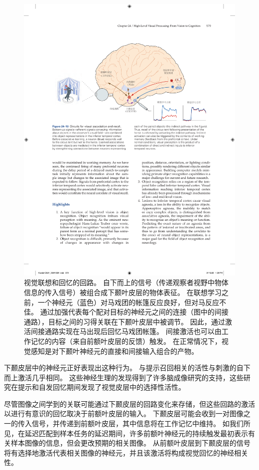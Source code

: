 \begin{figure}[htbp]
	\centering
	\includegraphics[width=1.0\linewidth]{chap24/fig_24_13}
	\caption{视觉联想和回忆的回路。
		自下而上的信号（传递观察者视野中物体信息的传入信号）被组合成下颞叶皮层的物体表征。
		在联想学习之前，一个神经元（蓝色）对马戏团的帐篷反应良好，但对马反应不佳。
		通过加强代表每个配对目标的神经元之间的连接（图中的间接通路），目标之间的习得关联在下颞叶皮层中被调节。
		因此，通过激活间接通路实现在马出现后回忆马戏团帐篷。
		间接激活也可以由工作记忆的内容（来自前额叶皮层的反馈）触发。
		在正常情况下，视觉感知是对下颞叶神经元的直接和间接输入组合的产物。}
	\label{fig:24_13}
\end{figure}


下颞皮层中的神经元正好表现出这种行为。
与提示召回相关的活性与刺激的自下而上激活几乎相同。 
这些神经生理的发现得到了许多脑成像研究的支持，这些研究在提示和自发回忆期间发现了视觉皮层中的选择性活性。


尽管图像之间学到的关联可能通过下颞皮层的回路变化来存储，但这些回路的激活以进行有意识的回忆取决于前额叶皮层的输入。
下颞皮层可能会收到一对图像之一的传入信号，并传递到前额叶皮层，其中信息将在工作记忆中维持。
如我们所见，在延迟匹配到样本任务的延迟期间，许多前额叶神经元的持续触发最初表示有关样本图像的信息，但会更改预期的相关图像。
从前额叶皮层到下颞皮层的信号将有选择地激活代表相关图像的神经元，并且该激活将构成视觉回忆的神经相关性。



